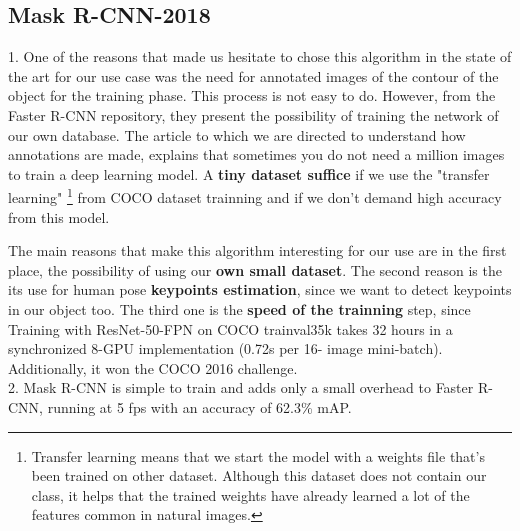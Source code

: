 \documentclass[10pt]{article}
\begin{document}
\subsection{Mask R-CNN-2018}
1. One of the reasons that made us hesitate to chose this algorithm in the state of the art for our use case was the need for annotated images of the contour of the object for the training phase. This process is not easy to do. However, from the Faster R-CNN repository\cite{matterport_maskrcnn_2017}, they present the possibility of training the network of our own database. The article to which we are directed\cite{MaskRCNNNotations} to understand how annotations are made, explains that sometimes you do not need a million images to train a deep learning model. A \textbf{tiny dataset suffice} if we use the "transfer learning" \footnote{ Transfer learning means that we start the model with a weights file that’s been trained on other dataset. Although this dataset does not contain our class, it helps that the trained weights have already learned a lot of the features common in natural images.} from COCO dataset trainning and if we don't demand  high accuracy from this model. 

The main reasons that make this algorithm interesting for our use are in the first place, the possibility of using our \textbf{own small dataset}. The second reason is the its use for human pose \textbf{keypoints estimation}, since we want to detect keypoints in our object too. The third one is the \textbf{speed of the trainning} step, since Training with ResNet-50-FPN on COCO trainval35k takes 32 hours in a synchronized 8-GPU implementation (0.72s per 16-
image mini-batch). Additionally, it won the COCO 2016 challenge. \\

2. Mask R-CNN is simple to train and adds only a small overhead to Faster R-CNN, running at 5 fps with an accuracy of 62.3\% mAP.\\
\end{document}

